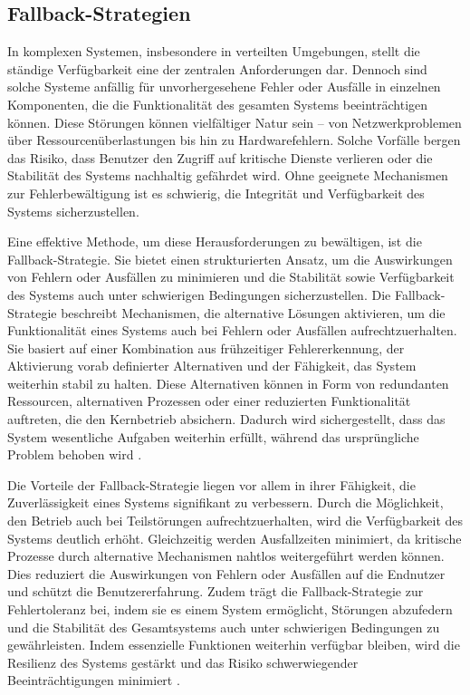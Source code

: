 \subsection{Fallback-Strategien}
In komplexen Systemen, insbesondere in verteilten Umgebungen, stellt die ständige Verfügbarkeit eine der zentralen Anforderungen dar. Dennoch sind solche Systeme anfällig für unvorhergesehene Fehler oder Ausfälle in einzelnen Komponenten, die die Funktionalität des gesamten Systems beeinträchtigen können. Diese Störungen können vielfältiger Natur sein – von Netzwerkproblemen über Ressourcenüberlastungen bis hin zu Hardwarefehlern. Solche Vorfälle bergen das Risiko, dass Benutzer den Zugriff auf kritische Dienste verlieren oder die Stabilität des Systems nachhaltig gefährdet wird. Ohne geeignete Mechanismen zur Fehlerbewältigung ist es schwierig, die Integrität und Verfügbarkeit des Systems sicherzustellen.

Eine effektive Methode, um diese Herausforderungen zu bewältigen, ist die Fallback-Strategie. Sie bietet einen strukturierten Ansatz, um die Auswirkungen von Fehlern oder Ausfällen zu minimieren und die Stabilität sowie Verfügbarkeit des Systems auch unter schwierigen Bedingungen sicherzustellen. Die Fallback-Strategie beschreibt Mechanismen, die alternative Lösungen aktivieren, um die Funktionalität eines Systems auch bei Fehlern oder Ausfällen aufrechtzuerhalten. Sie basiert auf einer Kombination aus frühzeitiger Fehlererkennung, der Aktivierung vorab definierter Alternativen und der Fähigkeit, das System weiterhin stabil zu halten. Diese Alternativen können in Form von redundanten Ressourcen, alternativen Prozessen oder einer reduzierten Funktionalität auftreten, die den Kernbetrieb absichern. Dadurch wird sichergestellt, dass das System wesentliche Aufgaben weiterhin erfüllt, während das ursprüngliche Problem behoben wird \cite{fallback-strategy}.

Die Vorteile der Fallback-Strategie liegen vor allem in ihrer Fähigkeit, die Zuverlässigkeit eines Systems signifikant zu verbessern. Durch die Möglichkeit, den Betrieb auch bei Teilstörungen aufrechtzuerhalten, wird die Verfügbarkeit des Systems deutlich erhöht. Gleichzeitig werden Ausfallzeiten minimiert, da kritische Prozesse durch alternative Mechanismen nahtlos weitergeführt werden können. Dies reduziert die Auswirkungen von Fehlern oder Ausfällen auf die Endnutzer und schützt die Benutzererfahrung. Zudem trägt die Fallback-Strategie zur Fehlertoleranz bei, indem sie es einem System ermöglicht, Störungen abzufedern und die Stabilität des Gesamtsystems auch unter schwierigen Bedingungen zu gewährleisten. Indem essenzielle Funktionen weiterhin verfügbar bleiben, wird die Resilienz des Systems gestärkt und das Risiko schwerwiegender Beeinträchtigungen minimiert \cite{fallback-strategy-cons}.
